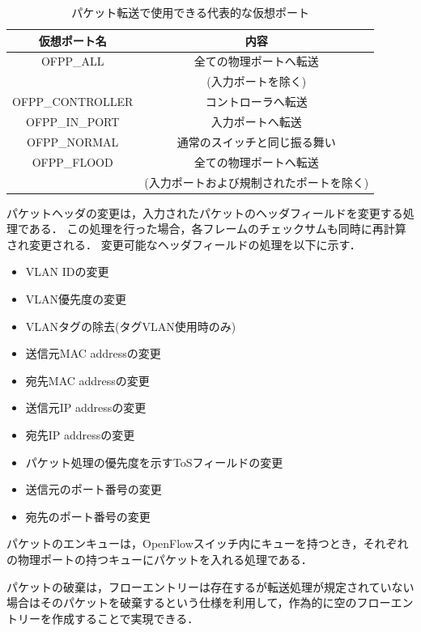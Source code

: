 \begin{table}[tb]
	\begin{center}
		\caption{パケット転送で使用できる代表的な仮想ポート}
		\begin{tabular}{c|c}
			\hline
			仮想ポート名 & 内容　\\ \hline \hline
			OFPP\_ALL & 全ての物理ポートへ転送　\\
			　& (入力ポートを除く)　\\ \hline
			OFPP\_CONTROLLER & コントローラへ転送 \\ \hline
			OFPP\_IN\_PORT & 入力ポートへ転送　\\ \hline
			OFPP\_NORMAL & 通常のスイッチと同じ振る舞い　\\ \hline
			OFPP\_FLOOD & 全ての物理ポートへ転送　\\
			 & (入力ポートおよび規制されたポートを除く) \\ \hline
		\end{tabular}
		\label{tab:2-2}
	\end{center}
\end{table}

パケットヘッダの変更は，入力されたパケットのヘッダフィールドを変更する処理である．
この処理を行った場合，各フレームのチェックサムも同時に再計算され変更される．
変更可能なヘッダフィールドの処理を以下に示す．

\begin{itemize}
	\item VLAN IDの変更
	\item VLAN優先度の変更
	\item VLANタグの除去(タグVLAN使用時のみ)
	\item 送信元MAC addressの変更
	\item 宛先MAC addressの変更
	\item 送信元IP addressの変更
	\item 宛先IP addressの変更
	\item パケット処理の優先度を示すToSフィールドの変更
	\item 送信元のポート番号の変更
	\item 宛先のポート番号の変更
\end{itemize}

パケットのエンキューは，OpenFlowスイッチ内にキューを持つとき，それぞれの物理ポートの持つキューにパケットを入れる処理である．

パケットの破棄は，フローエントリーは存在するが転送処理が規定されていない場合はそのパケットを破棄するという仕様を利用して，作為的に空のフローエントリーを作成することで実現できる．

